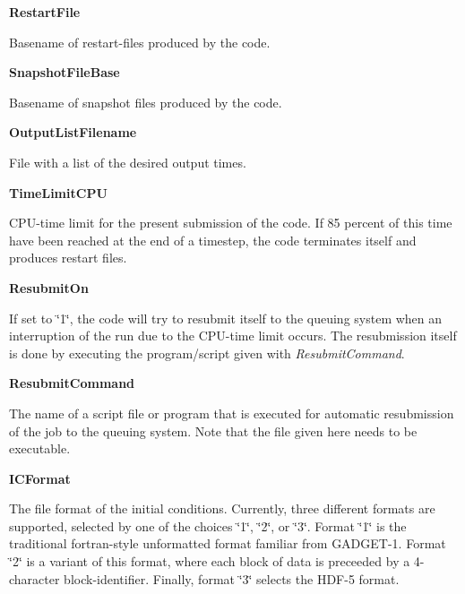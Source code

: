 \begin{DoxyItemize}
\item {\bfseries RestartFile} \par
 Basename of restart-\/files produced by the code.
\end{DoxyItemize}


\begin{DoxyItemize}
\item {\bfseries SnapshotFileBase} \par
 Basename of snapshot files produced by the code.
\end{DoxyItemize}


\begin{DoxyItemize}
\item {\bfseries OutputListFilename} \par
 File with a list of the desired output times.
\end{DoxyItemize}


\begin{DoxyItemize}
\item {\bfseries TimeLimitCPU} \par
 CPU-\/time limit for the present submission of the code. If 85 percent of this time have been reached at the end of a timestep, the code terminates itself and produces restart files.
\end{DoxyItemize}


\begin{DoxyItemize}
\item {\bfseries ResubmitOn} \par
 If set to \char`\"{}1\char`\"{}, the code will try to resubmit itself to the queuing system when an interruption of the run due to the CPU-\/time limit occurs. The resubmission itself is done by executing the program/script given with {\itshape ResubmitCommand\/}.
\end{DoxyItemize}


\begin{DoxyItemize}
\item {\bfseries ResubmitCommand} \par
 The name of a script file or program that is executed for automatic resubmission of the job to the queuing system. Note that the file given here needs to be executable.
\end{DoxyItemize}


\begin{DoxyItemize}
\item {\bfseries ICFormat} \par
 The file format of the initial conditions. Currently, three different formats are supported, selected by one of the choices \char`\"{}1\char`\"{}, \char`\"{}2\char`\"{}, or \char`\"{}3\char`\"{}. Format \char`\"{}1\char`\"{} is the traditional fortran-\/style unformatted format familiar from GADGET-\/1. Format \char`\"{}2\char`\"{} is a variant of this format, where each block of data is preceeded by a 4-\/character block-\/identifier. Finally, format \char`\"{}3\char`\"{} selects the HDF-\/5 format.
\end{DoxyItemize}


